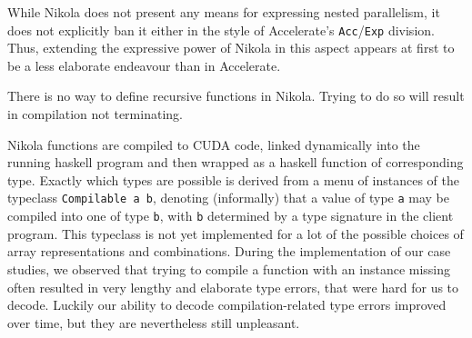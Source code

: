 While Nikola does not present any means for expressing nested parallelism, it
does not explicitly ban it either in the style of Accelerate's
\texttt{Acc}/\texttt{Exp} division. Thus, extending the expressive power of
Nikola in this aspect appears at first to be a less elaborate endeavour than in
Accelerate.

There is no way to define recursive functions in Nikola. Trying to do so
will result in compilation not terminating.

Nikola functions are compiled to CUDA code, linked dynamically into the running
haskell program and then wrapped as a haskell function of corresponding type.
Exactly which types are possible is derived from a menu of instances of the
typeclass \texttt{Compilable a b}, denoting (informally) that a value of type
\texttt{a} may be compiled into one of type \texttt{b}, with \texttt{b}
determined by a type signature in the client program. This typeclass is not yet
implemented for a lot of the possible choices of array representations and
combinations. During the implementation of our case studies, we observed that
trying to compile a function with an instance missing often resulted in very
lengthy and elaborate type errors, that were hard for us to decode. Luckily our
ability to decode compilation-related type errors improved over time, but they
are nevertheless still unpleasant.


